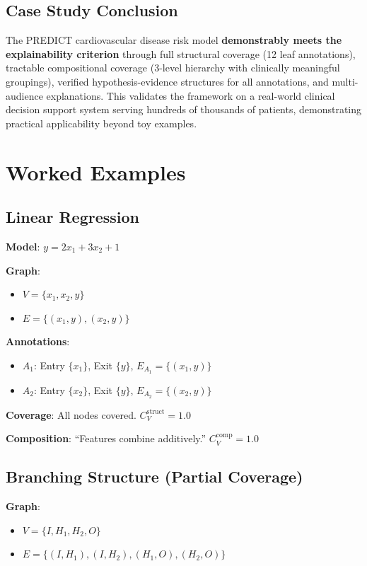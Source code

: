 \documentclass{article}
\begin{document}
\subsection{Case Study Conclusion}

The PREDICT cardiovascular disease risk model \textbf{demonstrably meets the explainability criterion} through full structural coverage (12 leaf annotations), tractable compositional coverage (3-level hierarchy with clinically meaningful groupings), verified hypothesis-evidence structures for all annotations, and multi-audience explanations. This validates the framework on a real-world clinical decision support system serving hundreds of thousands of patients, demonstrating practical applicability beyond toy examples.

\section{Worked Examples}

\subsection{Linear Regression}

\textbf{Model}: $y = 2x_1 + 3x_2 + 1$

\textbf{Graph}: 
\begin{itemize}
    \item $V = \{x_1, x_2, y\}$
    \item $E = \{(x_1, y), (x_2, y)\}$
\end{itemize}

\textbf{Annotations}:
\begin{itemize}
    \item $A_1$: Entry $\{x_1\}$, Exit $\{y\}$, $E_{A_1} = \{(x_1, y)\}$
    \item $A_2$: Entry $\{x_2\}$, Exit $\{y\}$, $E_{A_2} = \{(x_2, y)\}$
\end{itemize}

\textbf{Coverage}: All nodes covered. $C_V^{\text{struct}} = 1.0$ \checkmark

\textbf{Composition}: ``Features combine additively.'' $C_V^{\text{comp}} = 1.0$ \checkmark

\subsection{Branching Structure (Partial Coverage)}

\textbf{Graph}:
\begin{itemize}
    \item $V = \{I, H_1, H_2, O\}$
    \item $E = \{(I, H_1), (I, H_2), (H_1, O), (H_2, O)\}$
\end{itemize}
\end{document}
